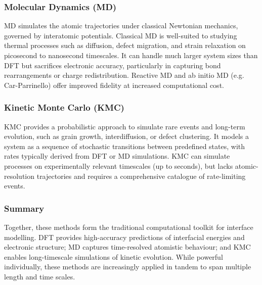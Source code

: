 \subsubsection{Molecular Dynamics (MD)}

MD simulates the atomic trajectories under classical Newtonian mechanics, governed by interatomic potentials. Classical MD is well-suited to studying thermal processes such as diffusion, defect migration, and strain relaxation on picosecond to nanosecond timescales. It can handle much larger system sizes than DFT but sacrifices electronic accuracy, particularly in capturing bond rearrangements or charge redistribution. Reactive MD and ab initio MD (e.g. Car-Parrinello) offer improved fidelity at increased computational cost.

\subsubsection{Kinetic Monte Carlo (KMC)}

KMC provides a probabilistic approach to simulate rare events and long-term evolution, such as grain growth, interdiffusion, or defect clustering. It models a system as a sequence of stochastic transitions between predefined states, with rates typically derived from DFT or MD simulations. KMC can simulate processes on experimentally relevant timescales (up to seconds), but lacks atomic-resolution trajectories and requires a comprehensive catalogue of rate-limiting events.

\subsubsection{Summary}

Together, these methods form the traditional computational toolkit for interface modelling. DFT provides high-accuracy predictions of interfacial energies and electronic structure; MD captures time-resolved atomistic behaviour; and KMC enables long-timescale simulations of kinetic evolution. While powerful individually, these methods are increasingly applied in tandem to span multiple length and time scales.